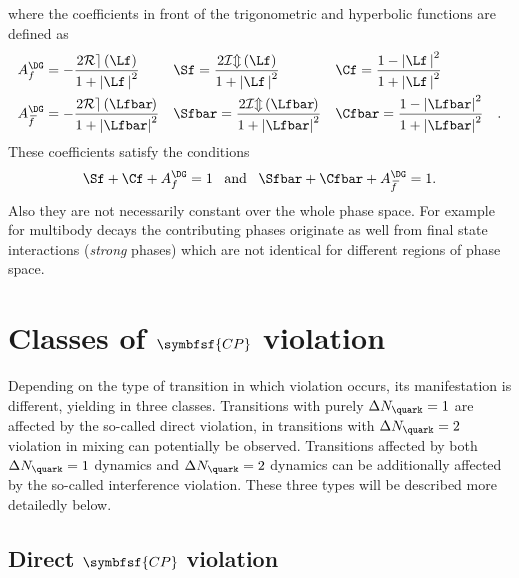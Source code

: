 where the coefficients in front of the trigonometric and hyperbolic functions are defined as
\begin{align}
&A_f^{\DG}=-\frac{2\mathcal{Re}\left(\Lf\right)}{1+\left|\Lf\,\right|^2}&
&\Sf=\frac{2\mathcal{Im}\left(\Lf\right)}{1+\left|\Lf\,\right|^2}&
&\Cf=\frac{1-\left|\Lf\,\right|^2}{1+\left|\Lf\,\right|^2}&\label{eq:cpcoeff}\\
&A_{\kern 1.5pt\overline{\kern -1.5pt f\kern 1.5pt}}^{\DG}=-\frac{2\mathcal{Re}\left(\Lfbar\kern -0.1em\right)}{1+\left|\Lfbar\right|^2}&
&\Sfbar=\frac{2\mathcal{Im}\left(\Lfbar\kern -0.1em\right)}{1+\left|\Lfbar\right|^2}&
&\Cfbar=\frac{1-\left|\Lfbar\right|^2}{1+\left|\Lfbar\right|^2}&\label{eq:cpcoeffbar}.
\end{align}
These coefficients satisfy the conditions
\begin{equation}
\Sf+\Cf+A_f^{\DG}=1\,\,\,\,\,\text{and}\,\,\,\,\,\Sfbar+\Cfbar+A_{\kern 1.5pt\overline{\kern -1.5pt f\kern 1.5pt}}^{\DG}=1.\label{eq:CpCoeffCond}
\end{equation}
Also they are not necessarily constant over the whole phase space.
For example for multibody decays the contributing phases originate as well from final state interactions (\ie \emph{strong} phases) which are not identical for different regions of phase space.

\section[head={Classes of \CP violation},tocentry={Classes of \CP violation}]{Classes of $\symbfsf{C{}P}$ violation}
\label{sec:CPVClasses}

Depending on the type of transition in which \CP violation occurs, its manifestation is different, yielding in three classes.
Transitions with purely $\Delta N_\quark=1$ are affected by the so-called direct \CP violation, in transitions with $\Delta N_\quark=2$ \CP violation in mixing can potentially be observed.
Transitions affected by both $\Delta N_\quark=1$ dynamics and $\Delta N_\quark=2$ dynamics can be additionally affected by the so-called interference \CP violation.
These three types will be described more detailedly below.


\subsection[head={Direct \CP violation},tocentry={Direct \CP violation}]{Direct $\symbfsf{C{}P}$ violation}
\label{sec:DirectCPV}


